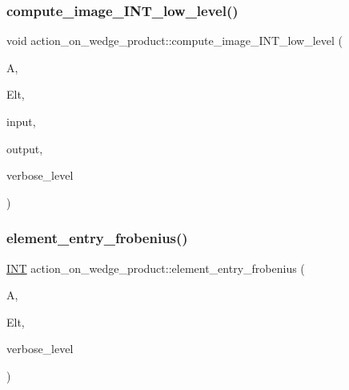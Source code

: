 \subsubsection{\texorpdfstring{compute\+\_\+image\+\_\+\+I\+N\+T\+\_\+low\+\_\+level()}{compute\_image\_INT\_low\_level()}}
{\footnotesize\ttfamily void action\+\_\+on\+\_\+wedge\+\_\+product\+::compute\+\_\+image\+\_\+\+I\+N\+T\+\_\+low\+\_\+level (\begin{DoxyParamCaption}\item[{\mbox{\hyperlink{classaction}{action}} \&}]{A,  }\item[{\mbox{\hyperlink{galois_8h_a09fddde158a3a20bd2dcadb609de11dc}{I\+NT}} $\ast$}]{Elt,  }\item[{\mbox{\hyperlink{galois_8h_a09fddde158a3a20bd2dcadb609de11dc}{I\+NT}} $\ast$}]{input,  }\item[{\mbox{\hyperlink{galois_8h_a09fddde158a3a20bd2dcadb609de11dc}{I\+NT}} $\ast$}]{output,  }\item[{\mbox{\hyperlink{galois_8h_a09fddde158a3a20bd2dcadb609de11dc}{I\+NT}}}]{verbose\+\_\+level }\end{DoxyParamCaption})}

\mbox{\label{classaction__on__wedge__product_a2fff9c661f45e707fc0b69c5ecf67268}} 
\subsubsection{\texorpdfstring{element\+\_\+entry\+\_\+frobenius()}{element\_entry\_frobenius()}}
{\footnotesize\ttfamily \mbox{\hyperlink{galois_8h_a09fddde158a3a20bd2dcadb609de11dc}{I\+NT}} action\+\_\+on\+\_\+wedge\+\_\+product\+::element\+\_\+entry\+\_\+frobenius (\begin{DoxyParamCaption}\item[{\mbox{\hyperlink{classaction}{action}} \&}]{A,  }\item[{\mbox{\hyperlink{galois_8h_a09fddde158a3a20bd2dcadb609de11dc}{I\+NT}} $\ast$}]{Elt,  }\item[{\mbox{\hyperlink{galois_8h_a09fddde158a3a20bd2dcadb609de11dc}{I\+NT}}}]{verbose\+\_\+level }\end{DoxyParamCaption})}


